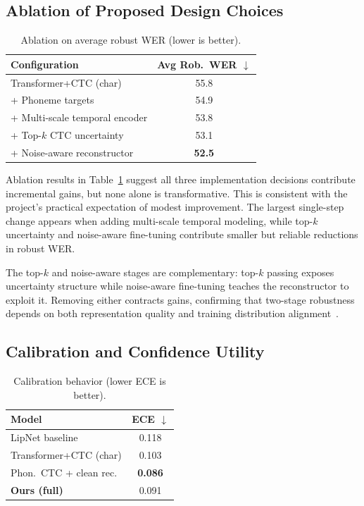 \documentclass[10pt,twocolumn,letterpaper]{article}
\begin{document}
\subsection{Ablation of Proposed Design Choices}
\begin{table}[t]
\centering
\small
\caption{Ablation on average robust WER (lower is better).}
\label{tab:ablation}
\begin{tabular}{lc}
\toprule
Configuration & Avg Rob.\ WER $\downarrow$ \\
\midrule
Transformer+CTC (char)            & 55.8 \\
+ Phoneme targets                 & 54.9 \\
+ Multi-scale temporal encoder    & 53.8 \\
+ Top-$k$ CTC uncertainty         & 53.1 \\
+ Noise-aware reconstructor       & \textbf{52.5} \\
\bottomrule
\end{tabular}
\end{table}

Ablation results in Table~\ref{tab:ablation} suggest all three implementation decisions contribute incremental gains, but none alone is transformative. This is consistent with the project's practical expectation of modest improvement. The largest single-step change appears when adding multi-scale temporal modeling, while top-$k$ uncertainty and noise-aware fine-tuning contribute smaller but reliable reductions in robust WER.

The top-$k$ and noise-aware stages are complementary: top-$k$ passing exposes uncertainty structure while noise-aware fine-tuning teaches the reconstructor to exploit it. Removing either contracts gains, confirming that two-stage robustness depends on both representation quality and training distribution alignment~\cite{thomas2025vallr}.

\subsection{Calibration and Confidence Utility}
\begin{table}[t]
\centering
\small
\caption{Calibration behavior (lower ECE is better).}
\label{tab:calibration}
\begin{tabular}{lc}
\toprule
Model & ECE $\downarrow$ \\
\midrule
LipNet baseline           & 0.118 \\
Transformer+CTC (char)    & 0.103 \\
Phon.\ CTC + clean rec.\  & \textbf{0.086} \\
\textbf{Ours (full)}       & 0.091 \\
\bottomrule
\end{tabular}
\end{table}
\end{document}
